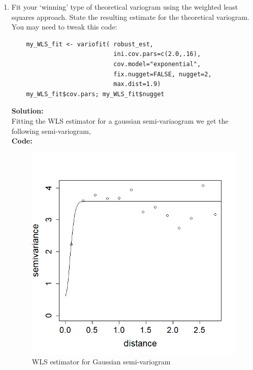 \documentclass[12pt]{article}
\makeatletter
\theoremstyle{homework}
\newenvironment{exercise}[1]
{\def\@currentlabel{#1}\exercisecore}
{\endexercisecore}
\newcommand{\localhead}[1]{\par\smallskip\noindent\textbf{#1}\nobreak\\}%
\newcommand\solution{\localhead{Solution:}}
\makeatother
\begin{document}
\begin{exercise}{4}
\begin{enumerate}
\begin{figure}[H]
\begin{center}
    \end{center}
  \end{figure}
  
  




  \item Fit your `winning' type of theoretical variogram 
  using the weighted least squares approach.
  State the resulting estimate for the theoretical variogram. You may need to tweak this code:
  \begin{verbatim}
    my_WLS_fit <- variofit( robust_est,
                            ini.cov.pars=c(2.0,.16),
                            cov.model="exponential",
                            fix.nugget=FALSE, nugget=2,
                            max.dist=1.9)
    my_WLS_fit$cov.pars; my_WLS_fit$nugget
  \end{verbatim}
  \solution Fitting the WLS estimator for a gaussian semi-variaogram we get the following semi-variogram,\\
  \textbf{Code:}
  \begin{center}
  
  \end{center}
  \begin{figure}[H]
    \begin{center}
      \caption{WLS estimator for Gaussian semi-variogram}
    \includegraphics[width = .60\textwidth]{Rplot06.png}
    \end{center}
  \end{figure}
  



  



  


\end{enumerate}
\end{exercise}
\end{document}
